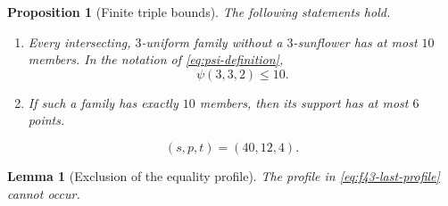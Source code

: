 \documentclass[10pt,a4paper]{amsart}
\newtheorem{proposition}{Proposition}
\newtheorem{lemma}{Lemma}
\begin{document}
\begin{proposition}[Finite triple bounds]
\label{prop:f43-triple-inputs}
The following statements hold.
\begin{enumerate}[label=\textup{(\roman*)}]
\item Every intersecting, $3$-uniform family without a $3$-sunflower has at
      most $10$ members. In the notation of \cref{eq:psi-definition},
      \[
       \psi(3,3,2)\le10.
      \]
\item If such a family has exactly $10$ members, then its support has at most
      $6$ points.
\end{enumerate}
\end{proposition}

\begin{equation}
 (s,p,t)=(40,12,4).
 \label{eq:f43-last-profile}
\end{equation}

\begin{lemma}[Exclusion of the equality profile]
\label{lem:f43-last-profile}
The profile in \cref{eq:f43-last-profile} cannot occur.
\end{lemma}
\end{document}
